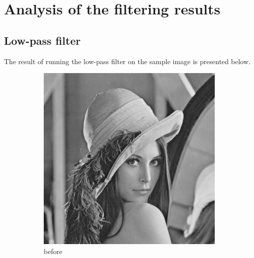 \documentclass[12pt]{article}
\begin{document}
\section{Analysis of the filtering results}
\subsection{Low-pass filter}
The result of running the low-pass filter on the sample image is presented below.
\begin{figure}[H]\centering
    \begin{subfigure}[t]{\subfiguresize}\centering
        \includegraphics[width=\textwidth]{img/lena.png}
        \caption{before}
    \end{subfigure}
    \hspace{2em}
    \begin{subfigure}[t]{\subfiguresize}\centering

\end{subfigure}
\end{figure}
\end{document}
